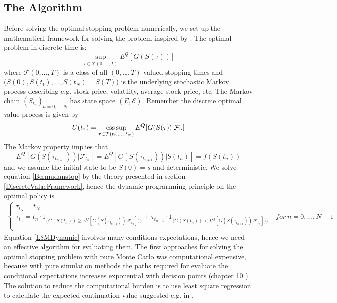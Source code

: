 \subsection{The Algorithm}
Before solving the optimal stopping problem numerically, we set up the mathematical framework for solving the problem inspired by \parencite{analysisLSM}. The optimal problem in discrete time is:
\begin{equation}\label{Bermudanstop}
\sup_{\tau \in \mathcal{T}(0,\ldots,T)} E^Q[G(S(\tau))]
\end{equation}
where $\mathcal{T}(0,\ldots,T)$ is a class of all $(0,\ldots,T)$-valued stopping times and $\bigg(S(0),S(t_1), \ldots, S(t_N)=S(T)\bigg)$ is the underlying stochastic Markov process describing e.g. stock price, volatility, average stock price, etc. The Markov chain $(S_{t_n})_{n=0,\ldots,N}$ has state space $(E, \mathcal{E})$. Remember the discrete optimal value process is given by
$$U(t_n)=\operatorname*{ess\,sup}_{\tau \in \mathcal{T}(t_n,\ldots,t_N)} E^Q[G(S(\tau))|\mathcal{F}_n]$$
The Markov property implies that 
$$E^Q[G(S(\tau_{t_{n+1}}))|\mathcal{F}_{t_n}]=E^Q[G(S(\tau_{t_{n+1}}))|S(t_n)]=f(S(t_n))$$ 
and we assume the initial state to be $S(0)=s$ and deterministic. We solve equation \eqref{Bermudanstop} by the theory presented in section \ref{DiscreteValueFramework}, hence the dynamic programming principle on the optimal policy is
\begin{equation}\label{LSMDynamic}
\begin{split}
\begin{cases}
          \tau_{t_N} = t_N\\
          \tau_{t_n} = t_n \cdot 1_{\{G(S(t_n)) \geq E^Q[G(S(\tau_{t_{n+1}}))|\mathcal{F}_{t_n}])\}} + \tau_{t_{n+1}} \cdot 1_{\{G(S(t_n)) < E^Q[G(S(\tau_{t_{n+1}}))|\mathcal{F}_{t_n}])\}} \quad for \ n={0,\ldots,N-1} \\ 
\end{cases}
\end{split}
\end{equation}
Equation \eqref{LSMDynamic} involves many conditions expectations, hence we need an effective algorithm for evaluating them. The first approaches for solving the optimal stopping problem with pure Monte Carlo was computational expensive, because with pure simulation methods the paths required for evaluate the conditional expectations increases exponential with decision points (chapter 10 \parencite{OVERHAUSMARCUS2007EHD}). The solution to reduce the computational burden is to use least square regression to calculate the expected continuation value suggested e.g. in \parencite{LSM,Tsitsiklis}. \\

